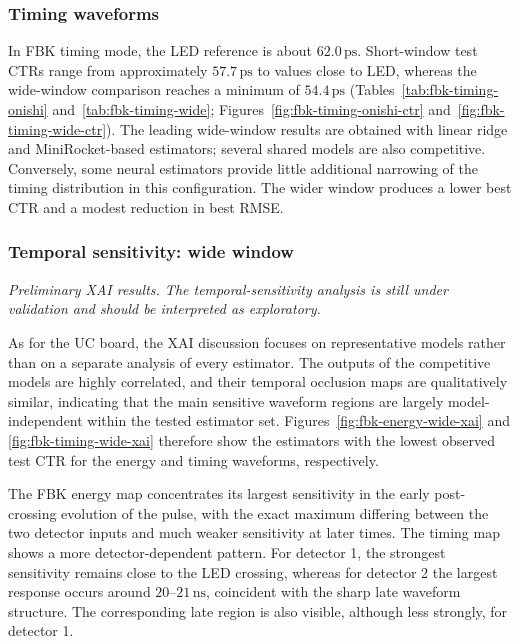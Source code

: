 


\subsubsection{Timing waveforms}
In FBK timing mode, the LED reference is about $62.0\,\mathrm{ps}$.
Short-window test CTRs range from approximately $57.7\,\mathrm{ps}$
to values close to LED, whereas the wide-window comparison reaches a
minimum of $54.4\,\mathrm{ps}$
(Tables~\ref{tab:fbk-timing-onishi} and~\ref{tab:fbk-timing-wide};
Figures~\ref{fig:fbk-timing-onishi-ctr} and~\ref{fig:fbk-timing-wide-ctr}).
The leading wide-window results are obtained with linear ridge and
MiniRocket-based estimators; several shared models are also competitive.
Conversely, some neural estimators provide little additional narrowing
of the timing distribution in this configuration. The wider window
produces a lower best CTR and a modest reduction in best RMSE.




\subsubsection{Temporal sensitivity: wide window}
\textit{Preliminary XAI results. The temporal-sensitivity analysis is
still under validation and should be interpreted as exploratory.}

As for the UC board, the XAI discussion focuses on representative
models rather than on a separate analysis of every estimator. The
outputs of the competitive models are highly correlated, and their
temporal occlusion maps are qualitatively similar, indicating that the
main sensitive waveform regions are largely model-independent within
the tested estimator set. Figures~\ref{fig:fbk-energy-wide-xai} and
\ref{fig:fbk-timing-wide-xai} therefore show the estimators with the
lowest observed test CTR for the energy and timing waveforms,
respectively.

The FBK energy map concentrates its largest sensitivity in the early
post-crossing evolution of the pulse, with the exact maximum differing
between the two detector inputs and much weaker sensitivity at later
times. The timing map shows a more detector-dependent pattern. For
detector 1, the strongest sensitivity remains close to the LED crossing,
whereas for detector 2 the largest response occurs around
$20$--$21\,\mathrm{ns}$, coincident with the sharp late waveform
structure. The corresponding late region is also visible, although less
strongly, for detector 1.

